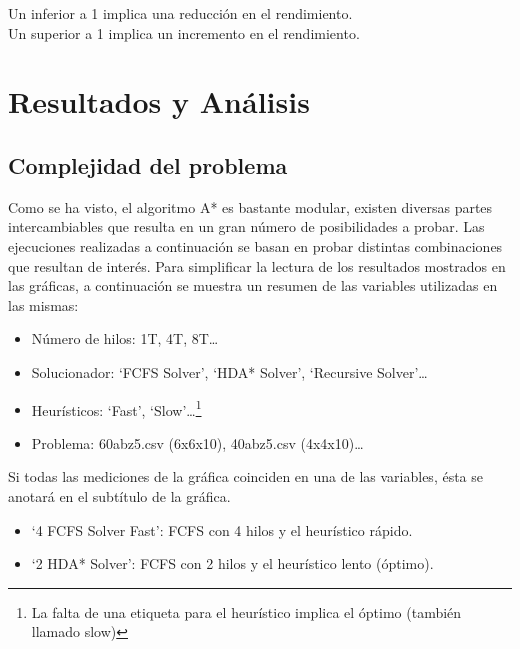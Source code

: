 \begin{keynotebox}
    Un  inferior a 1 implica una reducción en el rendimiento.\\
    Un  superior a 1 implica un incremento en el rendimiento. 
\end{keynotebox}

\section{Resultados y Análisis}

\subsection{Complejidad del problema}

\begin{notebox}
    Como se ha visto, el algoritmo A* es bastante modular,
    existen diversas partes intercambiables que resulta en un gran
    número de posibilidades a probar.
    Las ejecuciones realizadas a continuación se basan en probar
    distintas combinaciones que resultan de interés.
    Para simplificar la lectura de los resultados mostrados
    en las gráficas, a continuación se muestra un resumen de
    las variables utilizadas en las mismas:

    \begin{itemize}[itemsep=0.25px]
        \item Número de hilos: 1T, 4T, 8T\dots
        \item Solucionador: `FCFS Solver', `HDA* Solver', `Recursive Solver'\dots
        \item Heurísticos: `Fast', `Slow'\dots\footnote{La falta de una etiqueta para el heurístico implica el óptimo (también llamado slow)}
        \item Problema: 60\percentsign abz5.csv (6x6x10), 40\percentsign abz5.csv (4x4x10)\dots
    \end{itemize}

    Si todas las mediciones de la gráfica coinciden en una de las
    variables, ésta se anotará en el subtítulo de la gráfica.

    \begin{examplebox}
        \begin{itemize}[itemsep=0.25px]
            \item `4 FCFS Solver Fast': FCFS con 4 hilos y el heurístico rápido.
            \item `2 HDA* Solver': FCFS con 2 hilos y el heurístico lento (óptimo).
        \end{itemize}
    \end{examplebox}
\end{notebox}

